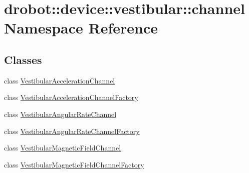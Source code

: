 \hypertarget{namespacedrobot_1_1device_1_1vestibular_1_1channel}{\section{drobot\-:\-:device\-:\-:vestibular\-:\-:channel Namespace Reference}
\label{namespacedrobot_1_1device_1_1vestibular_1_1channel}
}
\subsection*{Classes}
\begin{DoxyCompactItemize}
\item 
class \hyperlink{classdrobot_1_1device_1_1vestibular_1_1channel_1_1VestibularAccelerationChannel}{Vestibular\-Acceleration\-Channel}
\item 
class \hyperlink{classdrobot_1_1device_1_1vestibular_1_1channel_1_1VestibularAccelerationChannelFactory}{Vestibular\-Acceleration\-Channel\-Factory}
\item 
class \hyperlink{classdrobot_1_1device_1_1vestibular_1_1channel_1_1VestibularAngularRateChannel}{Vestibular\-Angular\-Rate\-Channel}
\item 
class \hyperlink{classdrobot_1_1device_1_1vestibular_1_1channel_1_1VestibularAngularRateChannelFactory}{Vestibular\-Angular\-Rate\-Channel\-Factory}
\item 
class \hyperlink{classdrobot_1_1device_1_1vestibular_1_1channel_1_1VestibularMagneticFieldChannel}{Vestibular\-Magnetic\-Field\-Channel}
\item 
class \hyperlink{classdrobot_1_1device_1_1vestibular_1_1channel_1_1VestibularMagneticFieldChannelFactory}{Vestibular\-Magnetic\-Field\-Channel\-Factory}
\end{DoxyCompactItemize}
